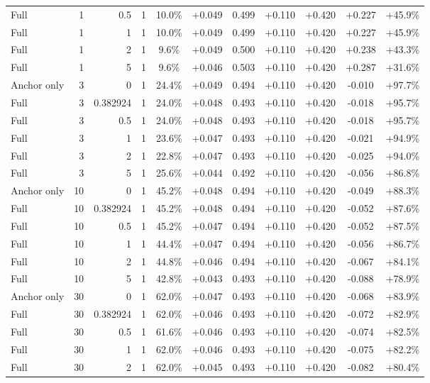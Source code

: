 \begin{table}[htbp]
\begin{tabular}{lrrrccccccc}
Full & 1 & 0.5 & 1 & 10.0\% & +0.049 & 0.499 & +0.110 & +0.420 & +0.227 & +45.9\% \\
Full & 1 & 1 & 1 & 10.0\% & +0.049 & 0.499 & +0.110 & +0.420 & +0.227 & +45.9\% \\
Full & 1 & 2 & 1 & 9.6\% & +0.049 & 0.500 & +0.110 & +0.420 & +0.238 & +43.3\% \\
Full & 1 & 5 & 1 & 9.6\% & +0.046 & 0.503 & +0.110 & +0.420 & +0.287 & +31.6\% \\
Anchor only & 3 & 0 & 1 & 24.4\% & +0.049 & 0.494 & +0.110 & +0.420 & -0.010 & +97.7\% \\
Full & 3 & 0.382924 & 1 & 24.0\% & +0.048 & 0.493 & +0.110 & +0.420 & -0.018 & +95.7\% \\
Full & 3 & 0.5 & 1 & 24.0\% & +0.048 & 0.493 & +0.110 & +0.420 & -0.018 & +95.7\% \\
Full & 3 & 1 & 1 & 23.6\% & +0.047 & 0.493 & +0.110 & +0.420 & -0.021 & +94.9\% \\
Full & 3 & 2 & 1 & 22.8\% & +0.047 & 0.493 & +0.110 & +0.420 & -0.025 & +94.0\% \\
Full & 3 & 5 & 1 & 25.6\% & +0.044 & 0.492 & +0.110 & +0.420 & -0.056 & +86.8\% \\
Anchor only & 10 & 0 & 1 & 45.2\% & +0.048 & 0.494 & +0.110 & +0.420 & -0.049 & +88.3\% \\
Full & 10 & 0.382924 & 1 & 45.2\% & +0.048 & 0.494 & +0.110 & +0.420 & -0.052 & +87.6\% \\
Full & 10 & 0.5 & 1 & 45.2\% & +0.047 & 0.494 & +0.110 & +0.420 & -0.052 & +87.5\% \\
Full & 10 & 1 & 1 & 44.4\% & +0.047 & 0.494 & +0.110 & +0.420 & -0.056 & +86.7\% \\
Full & 10 & 2 & 1 & 44.8\% & +0.046 & 0.494 & +0.110 & +0.420 & -0.067 & +84.1\% \\
Full & 10 & 5 & 1 & 42.8\% & +0.043 & 0.493 & +0.110 & +0.420 & -0.088 & +78.9\% \\
Anchor only & 30 & 0 & 1 & 62.0\% & +0.047 & 0.493 & +0.110 & +0.420 & -0.068 & +83.9\% \\
Full & 30 & 0.382924 & 1 & 62.0\% & +0.046 & 0.493 & +0.110 & +0.420 & -0.072 & +82.9\% \\
Full & 30 & 0.5 & 1 & 61.6\% & +0.046 & 0.493 & +0.110 & +0.420 & -0.074 & +82.5\% \\
Full & 30 & 1 & 1 & 62.0\% & +0.046 & 0.493 & +0.110 & +0.420 & -0.075 & +82.2\% \\
Full & 30 & 2 & 1 & 62.0\% & +0.045 & 0.493 & +0.110 & +0.420 & -0.082 & +80.4\% \\

\end{tabular}
\end{table}
